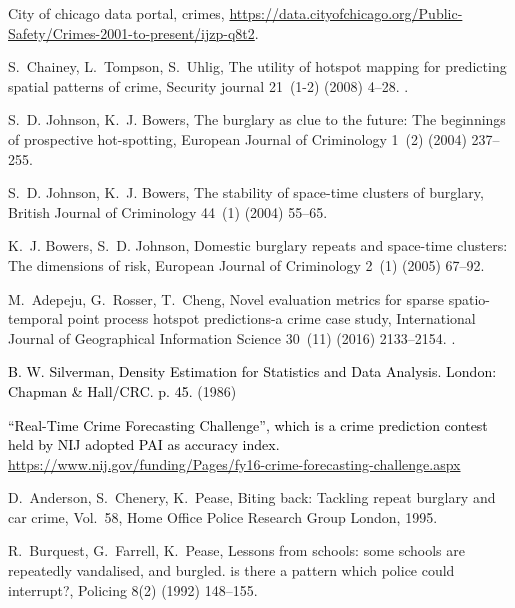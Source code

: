 \documentclass[review]{elsarticle}
\newcommand{\blue}[1]{\textcolor{black}{#1}}
\begin{document}
\begin{thebibliography}{10}
City of chicago data portal, crimes,
  \url{https://data.cityofchicago.org/Public-Safety/Crimes-2001-to-present/ijzp-q8t2}.

S.~Chainey, L.~Tompson, S.~Uhlig, The utility of hotspot mapping for predicting
  spatial patterns of crime, Security journal 21~(1-2) (2008) 4--28.
\newblock \href {http://dx.doi.org/10.1057/palgrave.sj.8350066}
  {}.

S.~D. Johnson, K.~J. Bowers, The burglary as clue to the future: The beginnings
  of prospective hot-spotting, European Journal of Criminology 1~(2) (2004)
  237--255.

S.~D. Johnson, K.~J. Bowers, The stability of space-time clusters of burglary,
  British Journal of Criminology 44~(1) (2004) 55--65.

K.~J. Bowers, S.~D. Johnson, Domestic burglary repeats and space-time clusters:
  The dimensions of risk, European Journal of Criminology 2~(1) (2005) 67--92.

M.~Adepeju, G.~Rosser, T.~Cheng, Novel evaluation metrics for sparse
  spatio-temporal point process hotspot predictions-a crime case study,
  International Journal of Geographical Information Science 30~(11) (2016)
  2133--2154.
\newblock \href {http://dx.doi.org/10.1080/13658816.2016.1159684}
  {}.


\blue{B. W. Silverman, Density Estimation for Statistics and Data Analysis. London: Chapman \& Hall/CRC. p. 45.}
(1986){}

\blue{
“Real-Time Crime Forecasting Challenge”, which is a crime prediction contest held by NIJ adopted PAI as accuracy index.
\url{https://www.nij.gov/funding/Pages/fy16-crime-forecasting-challenge.aspx}}

D.~Anderson, S.~Chenery, K.~Pease, Biting back: Tackling repeat burglary and
  car crime, Vol.~58, Home Office Police Research Group London, 1995.

R.~Burquest, G.~Farrell, K.~Pease, Lessons from schools: some schools are
  repeatedly vandalised, and burgled. is there a pattern which police could
  interrupt?, Policing 8(2) (1992) 148--155.


\end{thebibliography}
\end{document}
